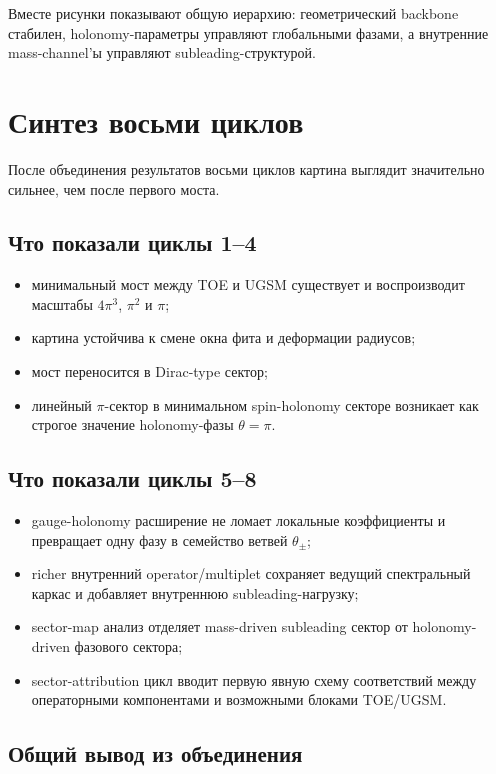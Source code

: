 \documentclass[12pt,a4paper]{article}
\begin{document}
Вместе рисунки показывают общую иерархию: геометрический backbone стабилен, holonomy-параметры управляют глобальными фазами, а внутренние mass-channel'ы управляют subleading-структурой.

\section{Синтез восьми циклов}

После объединения результатов восьми циклов картина выглядит значительно сильнее, чем после первого моста.

\subsection{Что показали циклы 1--4}
\begin{itemize}
    \item минимальный мост между TOE и UGSM существует и воспроизводит масштабы \(4\pi^3\), \(\pi^2\) и \(\pi\);
    \item картина устойчива к смене окна фита и деформации радиусов;
    \item мост переносится в Dirac-type сектор;
    \item линейный \(\pi\)-сектор в минимальном spin-holonomy секторе возникает как строгое значение holonomy-фазы \(\theta=\pi\).
\end{itemize}

\subsection{Что показали циклы 5--8}
\begin{itemize}
    \item gauge-holonomy расширение не ломает локальные коэффициенты и превращает одну фазу в семейство ветвей \(\theta_\pm\);
    \item richer внутренний operator/multiplet сохраняет ведущий спектральный каркас и добавляет внутреннюю subleading-нагрузку;
    \item sector-map анализ отделяет mass-driven subleading сектор от holonomy-driven фазового сектора;
    \item sector-attribution цикл вводит первую явную схему соответствий между операторными компонентами и возможными блоками TOE/UGSM.
\end{itemize}

\subsection{Общий вывод из объединения}
\end{document}
